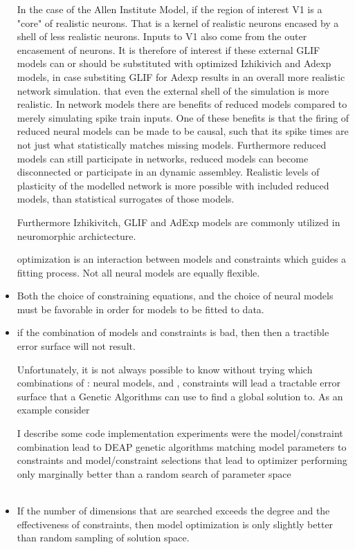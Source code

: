 \documentclass{report}
\begin{document}
\begin{itemize}
In the case of the Allen Institute Model, if the region of interest V1 is a "core" of realistic neurons. That is a kernel of realistic neurons encased by a shell of less realistic neurons. Inputs to V1 also come from the outer encasement of neurons. It is therefore of interest if these external GLIF models can or should be substituted with optimized Izhikivich and Adexp models, in case substiting GLIF for Adexp results in an overall more realistic network simulation. that even the external shell of the simulation is more realistic. In network models there are benefits of reduced models compared to merely simulating spike train inputs. One of these benefits is that the firing of reduced neural models can be made to be causal, such that its spike times are not just what statistically matches missing models. Furthermore reduced models can still participate in networks, reduced models can become disconnected or participate in an dynamic assembley. Realistic levels of plasticity of the modelled network is more possible with included reduced models, than statistical surrogates of those models.

Furthermore Izhikivitch, GLIF and AdExp models are commonly utilized in neuromorphic archictecture.

\subitem optimization is an interaction between models and constraints which guides a fitting process. Not all neural models are equally flexible.  
\item  Both the choice of constraining equations, and the choice of neural models must be favorable in order for models to be fitted to data.
\item 
\subitem if the combination of models and constraints is bad, then then a tractible error surface will not result.  

\subsubitem Unfortunately, it is not always possible to know without trying which combinations of \subitem[A]: neural models, and \subitem[B], constraints will lead a tractable error surface that a Genetic Algorithms can use to find a global solution to. As an example consider  

I describe some code implementation experiments were the model/constraint combination lead to DEAP genetic algorithms matching model parameters to constraints and model/constraint selections that lead to optimizer performing only marginally better than a random search of parameter space\\
\\
\item If the number of dimensions that are searched exceeds the degree and the effectiveness of constraints, then model optimization is only slightly better than random sampling of solution space.


\end{itemize}
\end{document}

